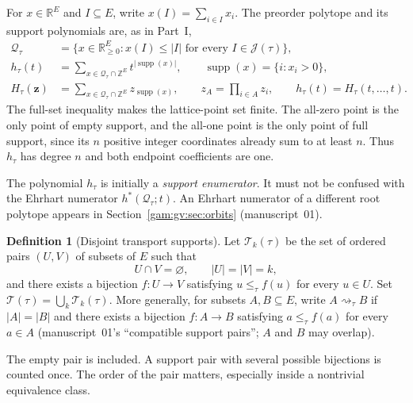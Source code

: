 \documentclass[11pt]{article}
\numberwithin{equation}{section}
\theoremstyle{definition}
\newtheorem{definition}[theorem]{Definition}
\newcommand{\R}{\mathbb R}
\newcommand{\Z}{\mathbb Z}
\newcommand{\J}{\mathcal J(\tau)}
\newcommand{\Qt}{\mathcal Q_\tau}
\newcommand{\supp}{\operatorname{supp}}
\newcommand{\zv}{\mathbf z}
\newcommand{\Tset}{\mathcal T}
\newcommand{\match}{\rightsquigarrow}
\begin{document}
For $x\in\R^E$ and $I\subseteq E$, write $x(I)=\sum_{i\in I}x_i$.
The preorder polytope and its support polynomials are, as in Part~I,
\begin{align}
 \Qt&=\{x\in\R_{\ge0}^{E}:x(I)\le |I|\text{ for every }I\in\J\},
 \label{gam:eq:Q}\\
 h_\tau(t)&=\sum_{x\in\Qt\cap\Z^E}t^{|\supp(x)|},
 \qquad \supp(x)=\{i:x_i>0\},\label{gam:eq:h}\\
 H_\tau(\zv)&=\sum_{x\in\Qt\cap\Z^E}z_{\supp(x)},\qquad
 z_A=\prod_{i\in A}z_i,\qquad h_\tau(t)=H_\tau(t,\ldots,t).\label{gam:gv:eq:H}
\end{align}
The full-set inequality makes the lattice-point set finite. The all-zero
point is the only point of empty support, and the all-one point is the only
point of full support, since its $n$ positive integer coordinates already sum
to at least $n$. Thus $h_\tau$ has degree $n$ and both endpoint
coefficients are one.

The polynomial $h_\tau$ is initially a \emph{support enumerator}. It must not
be confused with the Ehrhart numerator $h^*(\Qt;t)$. An Ehrhart numerator
of a different root polytope appears in Section~\ref{gam:gv:sec:orbits}
(manuscript~01).

\begin{definition}[Disjoint transport supports]\label{gam:def:cores}
Let $\Tset_k(\tau)$ be the set of ordered pairs $(U,V)$ of subsets of $E$ such
that
\[
 U\cap V=\varnothing,\qquad |U|=|V|=k,
\]
and there exists a bijection $f:U\to V$ satisfying $u\le_\tau f(u)$ for every
$u\in U$. Set $\Tset(\tau)=\bigcup_k\Tset_k(\tau)$. More generally, for
subsets $A,B\subseteq E$, write $A\match_\tau B$ if $|A|=|B|$ and there
exists a bijection $f:A\to B$ satisfying $a\le_\tau f(a)$ for every $a\in A$
(manuscript~01's ``compatible support pairs''; $A$ and $B$ may overlap).
\end{definition}
The empty pair is included. A support pair with several possible bijections
is counted once. The order of the pair matters, especially inside a
nontrivial equivalence class.
\end{document}
